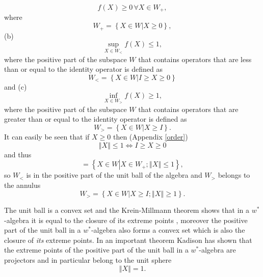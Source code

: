 \documentclass[aps,preprint]{revtex4}%
\begin{document}
\begin{equation}
f\left(  X\right)  \geq0\,\forall X\in W_{+}, \label{Positivity}%
\end{equation}
where
\begin{equation}
W_{+}=\left\{  X\in W\left\vert X\geq0\right.  \right\}  ,
\end{equation}
(b)%
\begin{equation}
\sup_{X\in W_{<}}f\left(  X\right)  \leq1, \label{Supcond}%
\end{equation}
where the positive part of the subspace $W$ that contains operators that are
less than or equal to the identity operator is defined as
\begin{equation}
W_{<}=\left\{  X\in W\left\vert I\geq X\geq0\right.  \right\}
\end{equation}
and (c)
\begin{equation}
\inf_{X\in W_{>}}f\left(  X\right)  \geq1, \label{Infcond}%
\end{equation}
where the positive part of the subspace $W$ that contains operators that are
greater than or equal to the identity operator is defined as
\begin{equation}
W_{>}=\left\{  X\in W\left\vert X\geq I\right.  \right\}  .
\end{equation}
It can easily be seen that if $X\geq0$ then (Appendix \ref{order})
\begin{equation}
\left\Vert X\right\Vert \leq1\Leftrightarrow I\geq X\geq0
\end{equation}
and thus
\begin{equation}
=\left\{  X\in W\left\vert X\in W_{+};\left\Vert X\right\Vert \leq1\right.
\right\}  ,
\end{equation}
so $W_{<}$ is in the positive part of the unit ball of the algebra and $W_{>}$
belongs to the annulus
\begin{equation}
W_{>}=\left\{  X\in W\left\vert X\geq I;\left\Vert X\right\Vert \geq1\right.
\right\}  .
\end{equation}


The unit ball is a convex set and the Krein-Millmann theorem \cite{Encyclo}
shows that in a $w^{\ast}$-algebra \cite{Encyclo} it is equal to the closure
of its extreme points \cite{Kummar67}, moreover the positive part of the unit
ball in a $w^{\ast}$-algebra also forms a convex set which is also the closure
of \emph{its} extreme points. In an important theorem Kadison \cite{Kadison}
has shown that the extreme points of the positive part of the unit ball in a
$w^{\ast}$-algebra are projectors and in particular belong to the unit sphere
\begin{equation}
\left\Vert X\right\Vert =1.
\end{equation}
\end{document}
